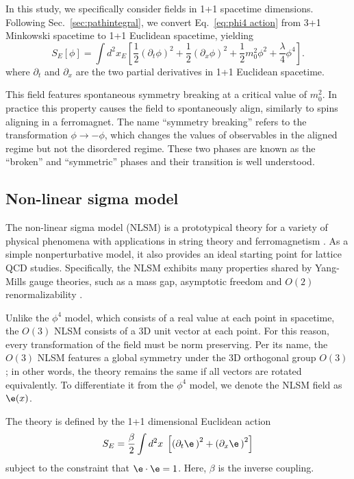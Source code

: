 In this study, we specifically consider fields in 1+1 spacetime dimensions. Following Sec.~\ref{sec:pathintegral}, we convert Eq.~\ref{eq:phi4 action} from 3+1 Minkowski spacetime to 1+1 Euclidean spacetime, yielding
\begin{equation}
    \label{eq:phi4 euclidean action}
    S_E[\phi] = \int d^2 x_E \left[\frac{1}{2}\left(\partial_t \phi\right)^2 + \frac{1}{2} \left(\partial_x \phi \right)^2 + \frac{1}{2} m_0^2 \phi^2 + \frac{\lambda}{4}\phi^4\right].
\end{equation}
where $\partial_t$ and $\partial_x$ are the two partial derivatives in 1+1 Euclidean spacetime. 

This field features spontaneous symmetry breaking at a critical value of $m_0^2$. In practice this property causes the field to spontaneously align, similarly to spins aligning in a ferromagnet. The name ``symmetry breaking'' refers to the transformation $\phi\rightarrow-\phi$, which changes the values of observables in the aligned regime but not the disordered regime. These two phases are known as the ``broken'' and ``symmetric'' phases and their transition is well understood.


\subsection{Non-linear sigma model}
The non-linear sigma model (NLSM) is a prototypical theory for a variety of physical phenomena with applications in string theory \cite{callan1985} and ferromagnetism \cite{polyakov1975}. As a simple nonperturbative model, it also provides an ideal starting point for lattice QCD studies. Specifically, the NLSM exhibits many properties shared by Yang-Mills gauge theories, such as a mass gap, asymptotic freedom and $O(2)$ renormalizability \cite{polyakov1975}.

Unlike the $\phi^4$ model, which consists of a real value at each point in spacetime, the $O(3)$ NLSM consists of a 3D unit vector at each point. For this reason, every transformation of the field must be norm preserving. Per its name, the $O(3)$ NLSM features a global symmetry under the 3D orthogonal group $O(3)$; in other words, the theory remains the same if all vectors are rotated equivalently. To differentiate it from the $\phi^4$ model, we denote the NLSM field as $\e(x)$.

The theory is defined by the 1+1 dimensional Euclidean action 
\begin{equation}
    \label{eq:nlsm euclidean action}
    S_E = \frac{\beta}{2} \int d^2x \; \left[ \left(\partial_t \e\, \right)^2+ \left( \partial_x \e\,\right)^2 \right]
\end{equation}
subject to the constraint that $\e\cdot\e = 1$. Here, $\beta$ is the inverse coupling.


